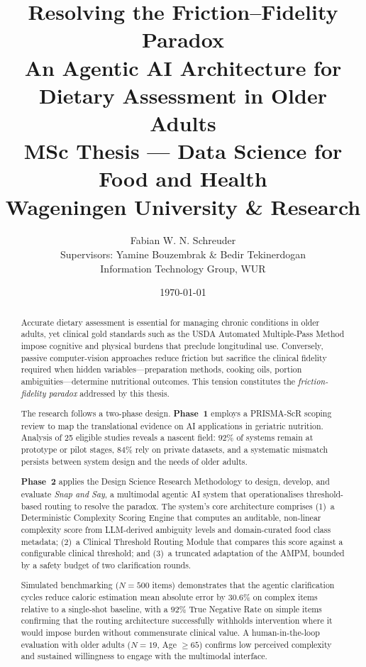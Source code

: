 \documentclass[12pt, a4paper, openany]{report}
\title{%
    \textbf{Resolving the Friction--Fidelity Paradox}\\[0.5em]
    \large An Agentic AI Architecture for\\
    Dietary Assessment in Older Adults\\[1em]
    \normalsize MSc Thesis --- Data Science for Food and Health\\
    Wageningen University \& Research
}
\author{Fabian W. N. Schreuder\\[0.5em]
    \small Supervisors: Yamine Bouzembrak \& Bedir Tekinerdogan\\
    \small Information Technology Group, WUR
}
\date{\today}
\begin{document}

\maketitle
\setcounter{page}{0}

\begin{abstract}

    \noindent
    Accurate dietary assessment is essential for managing chronic conditions in older adults, yet clinical gold standards such as the USDA Automated Multiple-Pass Method impose cognitive and physical burdens that preclude longitudinal use. Conversely, passive computer-vision approaches reduce friction but sacrifice the clinical fidelity required when hidden variables---preparation methods, cooking oils, portion ambiguities---determine nutritional outcomes. This tension constitutes the \emph{friction-fidelity paradox} addressed by this thesis.

    The research follows a two-phase design. \textbf{Phase~1} employs a PRISMA-ScR scoping review to map the translational evidence on AI applications in geriatric nutrition. Analysis of 25 eligible studies reveals a nascent field: $92\%$ of systems remain at prototype or pilot stages, $84\%$ rely on private datasets, and a systematic mismatch persists between system design and the needs of older adults.

    \textbf{Phase~2} applies the Design Science Research Methodology to design, develop, and evaluate \emph{Snap and Say}, a multimodal agentic AI system that operationalises threshold-based routing to resolve the paradox. The system's core architecture comprises (1)~a Deterministic Complexity Scoring Engine that computes an auditable, non-linear complexity score from LLM-derived ambiguity levels and domain-curated food class metadata; (2)~a Clinical Threshold Routing Module that compares this score against a configurable clinical threshold; and (3)~a truncated adaptation of the AMPM, bounded by a safety budget of two clarification rounds.

    Simulated benchmarking ($N=500$ items) demonstrates that the agentic clarification cycles reduce caloric estimation mean absolute error by $30.6\%$ on complex items relative to a single-shot baseline, with a $92\%$ True Negative Rate on simple items confirming that the routing architecture successfully withholds intervention where it would impose burden without commensurate clinical value. A human-in-the-loop evaluation with older adults ($N=19$, Age $\geq 65$) confirms low perceived complexity and sustained willingness to engage with the multimodal interface.


\end{abstract}
\end{document}
